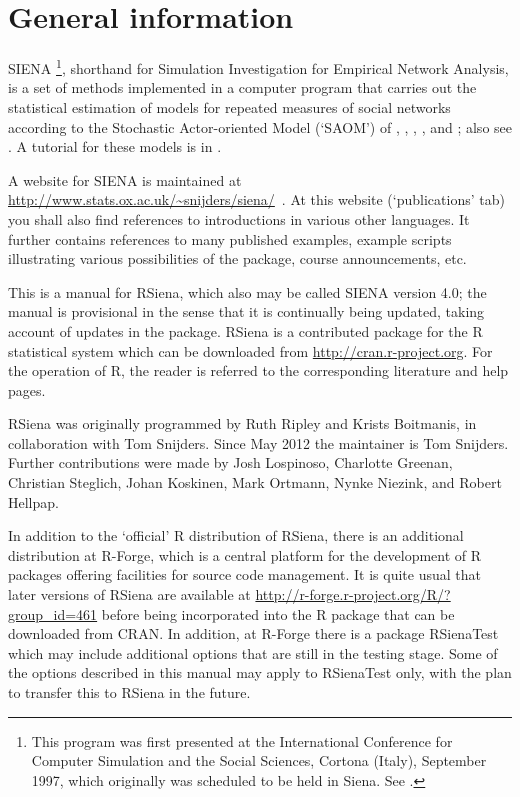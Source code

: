 \documentclass[a4paper,fleqn,11pt]{article}
\newcommand{\+}{\, + \,}
\newcommand{\R}{{\sf R }}
\newcommand{\Rn}{{\sf R}}
\newcommand{\rs}{{\sf RSiena}}
\newcommand{\RS}{{\sf RSiena }}
\newcommand{\SI}{{\sf SIENA }}
\newcommand{\si}{{\sf SIENA}}
\begin{document}
\section{General information}


\si
\footnote{This program was first presented at the
International Conference for Computer Simulation and the Social
Sciences, Cortona (Italy), September 1997, which originally was
scheduled to be held in Siena. See \citet{SnijdersDuijn97}.},
shorthand for {\sf Simulation Investigation for Empirical
Network Analysis}, is a set of methods
implemented in a computer program that carries out the
statistical estimation of models for repeated measures of social
networks according to the Stochastic Actor-oriented Model
 (`SAOM') of \citet{SnijdersDuijn97}, \citet{Snijders01},
\citet{SnijdersEA07},  \citet{SnijdersEA10a},
and \citet{Greenan14}; also see \citet{SteglichEA10}.
A tutorial for these models is in \citet{SnijdersEA10b}.

A website for \SI is maintained at
{\small\url{http://www.stats.ox.ac.uk/~snijders/siena/}~}.
At this website (`publications' tab)
you shall also find references to introductions in various other languages.
It further contains references to many published examples,
example scripts illustrating various possibilities of the package,
course announcements, etc.

This is a manual for \rs, which also may be called \SI version 4.0;
the manual is provisional in the sense
that it is continually being updated, taking account of
updates in the package.
\RS is a contributed package for the \R statistical system
which can be downloaded from
\url{http://cran.r-project.org}. For the operation of \Rn,
the reader is referred to the corresponding literature and help pages.

\RS was originally programmed by Ruth Ripley and Krists Boitmanis,
in collaboration with Tom Snijders.
Since May 2012 the maintainer is Tom Snijders.
Further contributions were made by Josh Lospinoso, Charlotte Greenan,
Christian Steglich, Johan Koskinen, Mark Ortmann, Nynke Niezink,
and Robert Hellpap.

In addition to the `official' \R distribution of \rs, there is
an additional distribution at R-Forge, which is
a central platform for the development of \R packages
offering facilities for source code management.
It is quite usual that later versions of \RS are available at
\url{http://r-forge.r-project.org/R/?group_id=461}
before being incorporated into the R package that can be downloaded from CRAN.
In addition, at R-Forge there is a package {\sf RSienaTest} which may include
additional options that are still in the testing stage.
Some of the options described in this manual may apply to
{\sf RSienaTest} only, with the plan to transfer this to \RS
in the future.
\end{document}
